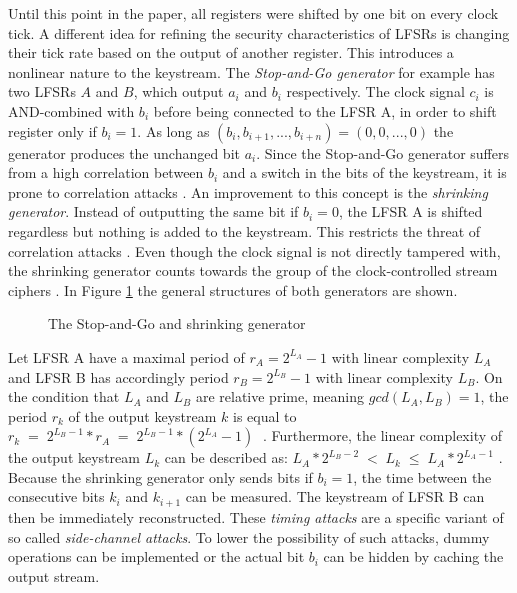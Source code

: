 Until this point in the paper, all registers were shifted by one bit on every clock tick. A different idea for refining the security characteristics of LFSRs is changing their tick rate based on the output of another register. This introduces a nonlinear nature to the keystream. The \emph{Stop-and-Go generator} for example has two LFSRs $A$ and $B$, which output $a_i$ and $b_i$ respectively. The clock signal $c_i$ is AND-combined with $b_i$ before being connected to the LFSR A, in order to shift register only if $b_i=1$. As long as $(b_i, b_{i+1}, ..., b_{i+n}) = (0,0,...,0)$ the generator produces the unchanged bit $a_i$. \cite[pp. 89-90]{Beth.1985b} Since the Stop-and-Go generator suffers from a high correlation between $b_i$ and a switch in the bits of the keystream, it is prone to correlation attacks \cite[p. 156]{Klein.2013}. An improvement to this concept is the \emph{shrinking generator}. Instead of outputting the same bit if $b_i=0$, the LFSR A is shifted regardless but nothing is added to the keystream. This restricts the threat of correlation attacks \cite[p. 159]{Klein.2013}. Even though the clock signal is not directly tampered with, the shrinking generator counts towards the group of the clock-controlled stream ciphers \cite[p. 23]{Robshaw.1995}. In Figure \ref{fig:clocked-generators} the general structures of both generators are shown.

\begin{figure}[htpb]
	\vspace{0.3cm}
	\centering
	\small
	
	\caption{The Stop-and-Go \cite[pp. 89-90]{Beth.1985b} and shrinking generator \cite[p. 159]{Klein.2013}}
	\label{fig:clocked-generators}
\end{figure}

Let LFSR A have a maximal period of $r_A=2^{L_A}-1$ with linear complexity $L_A$ and LFSR B has accordingly period $r_B=2^{L_B}-1$ with linear complexity $L_B$. On the condition that $L_A$ and $L_B$ are relative prime, meaning $gcd(L_A, L_B)=1$, the period $r_k$ of the output keystream $k$ is equal to $r_k\;=\;2^{L_B-1}*r_A\;=\;2^{L_B-1}*(2^{L_A}-1)\;$ \cite[p. 25]{coppersmith1993shrinking}\cite[p. 159]{Klein.2013}. Furthermore, the linear complexity of the output keystream $L_k$ can be described as: \space $L_A*2^{L_B-2} \;<\; L_k \;\leq\; L_A*2^{L_A-1}$ \cite[p. 25]{coppersmith1993shrinking}. \\

Because the shrinking generator only sends bits if $b_i=1$, the time between the consecutive bits $k_i$ and $k_{i+1}$ can be measured. The keystream of LFSR B can then be immediately reconstructed. These \emph{timing attacks} are a specific variant of so called \emph{side-channel attacks}. To lower the possibility of such attacks, dummy operations can be implemented or the actual bit $b_i$ can be hidden by caching the output stream. \cite[pp. 163-164]{Klein.2013} \\\\

